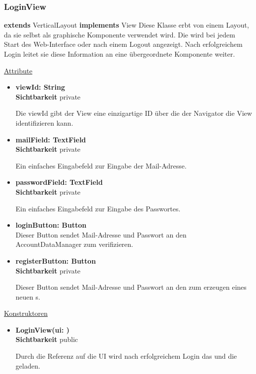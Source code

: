 \newpage
\subsubsection{LoginView}\label{LoginView}
\textbf{extends}  VerticalLayout \newline
\textbf{implements} View \newline
Diese Klasse erbt von einem Layout, da sie selbst als graphische Komponente verwendet wird. Die  wird bei jedem Start des Web-Interface oder nach einem Logout angezeigt. Nach erfolgreichem Login leitet sie diese Information an eine übergeordnete Komponente weiter.
\newline

\underline{Attribute}
\begin{itemize}
\itemsep0pt
\item \textbf{viewId: String} \hfill\\ 
\textbf{Sichtbarkeit} private

Die viewId gibt der View eine einzigartige ID über die der Navigator die View identifizieren kann.

\item \textbf{mailField: TextField} \hfill\\ 
\textbf{Sichtbarkeit} private

Ein einfaches Eingabefeld zur Eingabe der Mail-Adresse.

\item \textbf{passwordField: TextField} \hfill\\
\textbf{Sichtbarkeit} private

Ein einfaches Eingabefeld zur Eingabe des Passwortes.

\item \textbf{loginButton: Button} \hfill\\
Dieser Button sendet Mail-Adresse und Passwort an den AccountDataManager zum verifizieren.

\item \textbf{registerButton: Button} \hfill\\
\textbf{Sichtbarkeit} private

Dieser Button sendet Mail-Adresse und Passwort an den  zum erzeugen eines neuen s.

\end{itemize}

\underline{Konstruktoren}
\begin{itemize}
\itemsep0pt
\item \textbf{LoginView(ui: )} \hfill\\
\textbf{Sichtbarkeit} public

Durch die Referenz auf die UI wird nach erfolgreichem Login das  und die  geladen.
\end{itemize}

